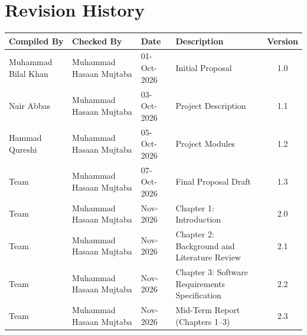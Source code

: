 \newpage
\chapter*{\centering Revision History}
\par\bigskip

\begin{table}[h!]
\centering
\small
\begin{tabular}{P{0.19\textwidth}P{0.2\textwidth}P{0.13\textwidth}P{0.25\textwidth}c}
\hline
\textbf{Compiled By} & \textbf{Checked By} & \textbf{Date} & \textbf{Description} & \textbf{Version} \\ \hline
  Muhammad Bilal Khan & Muhammad Hasaan Mujtaba & 01-Oct-2026 & Initial Proposal & 1.0 \\
  Nair Abbas & Muhammad Hasaan Mujtaba & 03-Oct-2026 & Project Description & 1.1 \\
  Hammad Qureshi & Muhammad Hasaan Mujtaba & 05-Oct-2026 & Project Modules & 1.2 \\
  Team & Muhammad Hasaan Mujtaba & 07-Oct-2026 & Final Proposal Draft & 1.3 \\
  Team & Muhammad Hasaan Mujtaba & Nov-2026 & Chapter 1: Introduction & 2.0 \\
  Team & Muhammad Hasaan Mujtaba & Nov-2026 & Chapter 2: Background and Literature Review & 2.1 \\
  Team & Muhammad Hasaan Mujtaba & Nov-2026 & Chapter 3: Software Requirements Specification & 2.2 \\
  Team & Muhammad Hasaan Mujtaba & Nov-2026 & Mid-Term Report (Chapters 1--3) & 2.3 \\
\hline
\end{tabular}
\end{table}

\newpage

